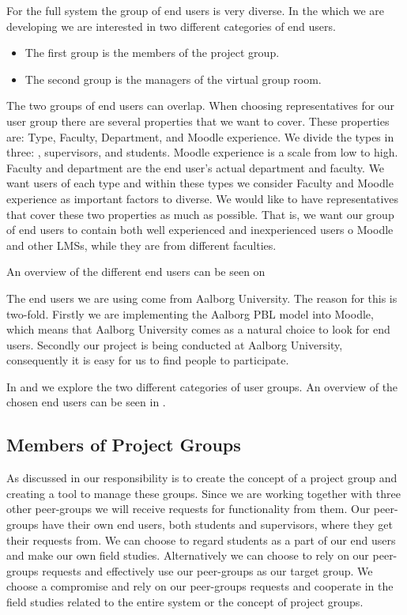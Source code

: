 For the full system the group of end users is very diverse.
In the \subsystem{} which we are developing we are interested in two different categories of end users.
\begin{itemize}
	\item The first group is the members of the project group.
	\item The second group is the managers of the virtual group room.
\end{itemize}
The two groups of end users can overlap. 
When choosing representatives for our user group there are several properties that we want to cover. 
These properties are: Type, Faculty, Department, and Moodle experience.
We divide the types in three: \admpers[c], supervisors, and students.
Moodle experience is a scale from low to high.
Faculty and department are the end user's actual department and faculty. %
We want users of each type and within these types we consider Faculty and Moodle experience as important factors to diverse.
We would like to have representatives that cover these two properties as much as possible.
That is, we want our group of end users to contain both well experienced and inexperienced users o  Moodle and other LMSs, while they are 
from different faculties. 

An overview of the different end users can be seen on 

The end users we are using come from Aalborg University.
The reason for this is two-fold.
Firstly we are implementing the Aalborg PBL model into Moodle, which means that Aalborg University comes as a natural choice to look for end users.
Secondly our project is being conducted at Aalborg University, consequently it is easy for us to find people to participate.

In  and  we explore the two different categories of user groups. 
An overview of the chosen end users can be seen in .


\subsection{Members of Project Groups}
\label{sub:endusersmembers}
As discussed in  our responsibility is to create the concept of a project group and creating a tool to manage these groups.
Since we are working together with three other peer-groups we will receive requests for functionality from them.
Our peer-groups have their own end users, both students and supervisors, where they get their requests from.
We can choose to regard students as a part of our end users and make our own field studies.
Alternatively we can choose to rely on our peer-groups requests and effectively use our peer-groups as our target group.
We choose a compromise and rely on our peer-groups requests and cooperate in the field studies related to the entire system or the concept of project groups.

